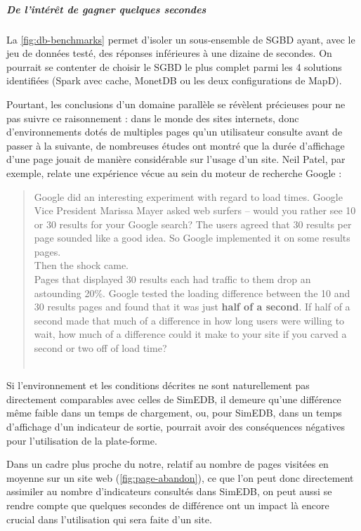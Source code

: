 			\subparagraph{De l'intérêt de gagner quelques secondes}
			
			La \cref{fig:db-benchmarks} permet d'isoler un sous-ensemble de SGBD ayant, avec le jeu de données testé, des réponses inférieures à une dizaine de secondes.
			On pourrait se contenter de choisir le SGBD le plus complet parmi les 4 solutions identifiées (Spark avec cache, MonetDB ou les deux configurations de MapD).
			
			Pourtant, les conclusions d'un domaine parallèle se révèlent précieuses pour ne pas suivre ce raisonnement :
			dans le monde des sites internets, donc d'environnements dotés de multiples pages qu'un utilisateur consulte avant de passer à la suivante, de nombreuses études ont montré que la durée d'affichage d'une page jouait de manière considérable sur l'usage d'un site.
			Neil Patel, par exemple, relate une expérience vécue au sein du moteur de recherche Google  : 
			
			\begin{quotation}
				\og
			Google did an interesting experiment with regard to load times. Google Vice President Marissa Mayer asked web surfers – would you rather see 10 or 30 results for your Google search? The users agreed that 30 results per page sounded like a good idea. So Google implemented it on some results pages.\\
			Then the shock came.\\
			Pages that displayed 30 results each had traffic to them drop an astounding 20\%. Google tested the loading difference between the 10 and 30 results pages and found that it was just \textbf{half of a second}. If half of a second made that much of a difference in how long users were willing to wait, how much of a difference could it make to your site if you carved a second or two off of load time?
				\fg{}\\
				\mbox{}~ \hfill  \autocite{patel_speed_2011}
			\end{quotation}
			
			Si l'environnement et les conditions décrites ne sont naturellement pas directement comparables avec celles de SimEDB, il demeure qu'une différence même faible dans un temps de chargement, ou, pour SimEDB, dans un temps d'affichage d'un indicateur de sortie, pourrait avoir des conséquences négatives pour l'utilisation de la plate-forme.
			
			Dans un cadre plus proche du notre, relatif au nombre de pages visitées en moyenne sur un site web (\cref{fig:page-abandon}), ce que l'on peut donc directement assimiler au nombre d'indicateurs consultés dans SimEDB, on peut aussi se rendre compte que quelques secondes de différence ont un impact là encore crucial dans l'utilisation qui sera faite d'un site.
			
